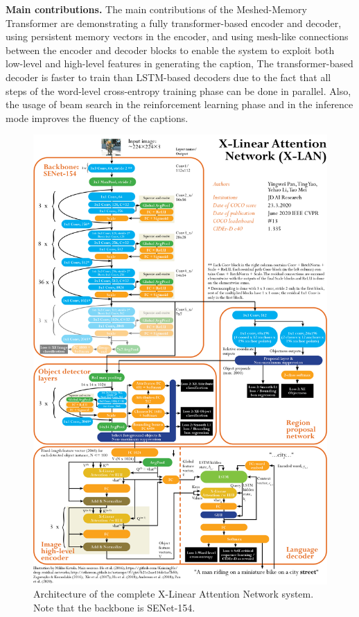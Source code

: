 \documentclass[english,twoside,openright]{HYgraduMLDS}
\begin{document}
\textbf{Main contributions.} The main contributions of the Meshed-Memory Transformer are demonstrating a fully transformer-based encoder and decoder, using persistent memory vectors in the encoder, and using mesh-like connections between the encoder and decoder blocks to enable the system to exploit both low-level and high-level features in generating the caption, The transformer-based decoder is faster to train than LSTM-based decoders due to the fact that all steps of the word-level cross-entropy training phase can be done in parallel. Also, the usage of beam search in the reinforcement learning phase and in the inference mode improves the fluency of the captions.

\pagebreak
\begin{figure}[H] 
\centering
\includegraphics[width=1.0\textwidth]{./images-indesign/Architecture_X-LAN.png}
\caption{Architecture of the complete X-Linear Attention Network system. Note that the backbone is SENet-154.}
\label{fig:architecture_X-LAN} 
\end{figure}
\end{document}
